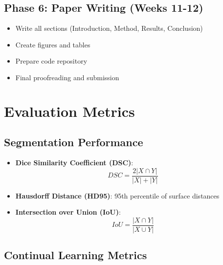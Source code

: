 \documentclass[conference]{IEEEtran}
\begin{document}
\subsection{Phase 6: Paper Writing (Weeks 11-12)}

\begin{itemize}
    \item Write all sections (Introduction, Method, Results, Conclusion)
    \item Create figures and tables
    \item Prepare code repository
    \item Final proofreading and submission
\end{itemize}

\section{Evaluation Metrics}

\subsection{Segmentation Performance}

\begin{itemize}
    \item \textbf{Dice Similarity Coefficient (DSC)}:
    \begin{equation}
    DSC = \frac{2|X \cap Y|}{|X| + |Y|}
    \end{equation}
    
    \item \textbf{Hausdorff Distance (HD95)}: 95th percentile of surface distances
    
    \item \textbf{Intersection over Union (IoU)}:
    \begin{equation}
    IoU = \frac{|X \cap Y|}{|X \cup Y|}
    \end{equation}
\end{itemize}

\subsection{Continual Learning Metrics}
\end{document}
